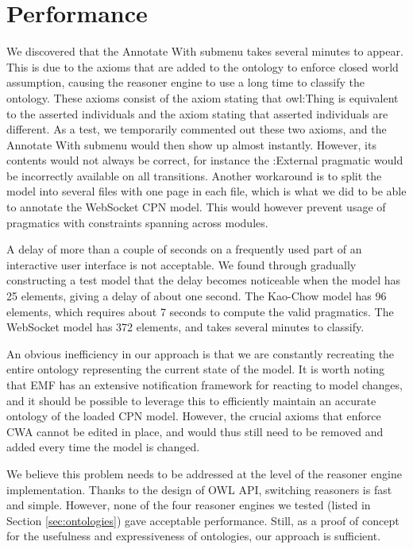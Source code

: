 \section{Performance}

We discovered that the Annotate With submenu takes several minutes to appear.
This is due to the axioms that are added to the ontology to enforce closed world
assumption, causing the reasoner engine to use a long time to classify the
ontology. These axioms consist of the axiom stating that owl:Thing is
equivalent to the asserted individuals and the axiom stating that asserted
individuals are different. As a test, we temporarily commented out these two
axioms, and the Annotate With submenu would then show up almost instantly.
However, its contents would not always be correct, for instance the :External
pragmatic would be incorrectly available on all transitions. Another workaround
is to split the model into several files with one page in each file,
which is what we did to be able to annotate the WebSocket CPN model.
This would however prevent usage of pragmatics with constraints spanning
across modules.

A delay of more than a couple of seconds on a frequently used part of an
interactive user interface is not acceptable. We found through gradually
constructing a test model that the delay becomes noticeable when the model has
25 elements, giving a delay of about one second. The Kao-Chow model has 96
elements, which requires about 7 seconds to compute the valid pragmatics. The
WebSocket model has 372 elements, and takes several minutes to classify.

An obvious inefficiency in our approach is that we are constantly recreating the
entire ontology representing the current state of the model. It is worth noting
that EMF has an extensive notification framework for reacting to model changes,
and it should be possible to leverage this to efficiently maintain an accurate
ontology of the loaded CPN model. However, the crucial axioms that enforce CWA
cannot be edited in place, and would thus still need to be removed and added
every time the model is changed.

We believe this problem needs to be addressed at the level of the reasoner
engine implementation. Thanks to the design of OWL API, switching reasoners is
fast and simple. However, none of the four reasoner engines we tested (listed in
Section \ref{sec:ontologies}) gave acceptable performance. Still, as a proof of
concept for the usefulness and expressiveness of ontologies, our approach is
sufficient.

